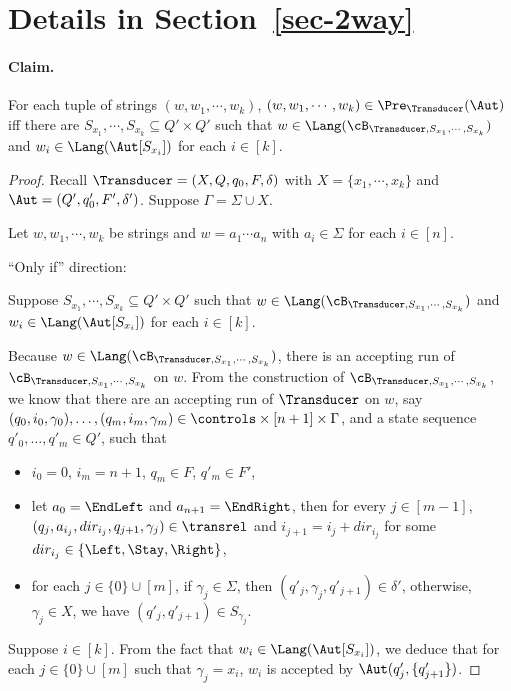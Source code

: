 
\section{Details in Section~\ref{sec-2way}}

\paragraph{Claim.} For each tuple of strings $(w, w_1,\cdots, w_k)$, $(w, w_1,\cdots, w_k) \in \Pre_\Transducer(\Aut)$ iff there are $S_{x_1}, \cdots, S_{x_k} \subseteq Q' \times Q'$ such that $w \in \Lang(\cB_{\Transducer, S_{x_1}, \cdots, S_{x_k}})$ and $w_i \in \Lang(\Aut[S_{x_i}])$ for each $i \in [k]$.

\begin{proof}
Recall $\Transducer = (X, Q, q_0, F, \delta)$ with $X= \{x_1,\cdots, x_k\}$ and $\Aut = (Q', q'_0, F', \delta')$. 
Suppose $\Gamma = \Sigma \cup X$. 

Let $w, w_1, \cdots, w_k$ be strings and $w = a_1 \cdots a_n$ with $a_i \in \Sigma$ for each $i \in [n]$.

\smallskip

\noindent ``Only if'' direction: 

Suppose $S_{x_1}, \cdots, S_{x_k} \subseteq Q' \times Q'$ such that $w \in \Lang(\cB_{\Transducer, S_{x_1}, \cdots, S_{x_k}})$ and $w_i \in \Lang(\Aut[S_{x_i}])$ for each $i \in [k]$.

Because $w \in \Lang(\cB_{\Transducer, S_{x_1}, \cdots, S_{x_k}})$, there is an accepting run of $\cB_{\Transducer, S_{x_1}, \cdots, S_{x_k}}$ on $w$. From the construction of  $\cB_{\Transducer, S_{x_1}, \cdots, S_{x_k}}$, we know that 
there are an accepting run of $\Transducer$ on $w$, 
say $(q_0, i_0, \gamma_0),\ldots, (q_m, i_m, \gamma_m) \in \controls \times [n+1] \times \Gamma$, and a state sequence $q'_0, \ldots, q'_m \in Q'$, such that 
\begin{itemize}
\item $i_0=0$, $i_m = n+1$, $q_m \in F$, $q'_m \in F'$,
%
\item let $a_0 = \EndLeft$ and $a_{n+1} = \EndRight$,  then for every $j \in [m-1]$, $(q_j, a_{i_j}, dir_{i_j}, q_{j+1}, \gamma_j) \in
        \transrel$ and $i_{j+1} = i_j + dir_{i_j}$ for some $dir_{i_j} \in \{\Left, \Stay, \Right\}$, 
 \item for each $j \in \{0\} \cup [m]$, if $\gamma_j \in \Sigma$, then $(q'_j, \gamma_j, q'_{j+1}) \in \delta'$, otherwise, $\gamma_j \in X$, we have $(q'_j, q'_{j+1}) \in S_{\gamma_j}$. 
\end{itemize}
Suppose $i \in [k]$. From the fact that $w_i \in \Lang(\Aut[S_{x_i}])$, we deduce that for each $j \in \{0\} \cup [m]$ such that $\gamma_j = x_i$, $w_i$ is accepted by $\Aut(q'_j, \{q'_{j+1}\})$.


\end{proof}
